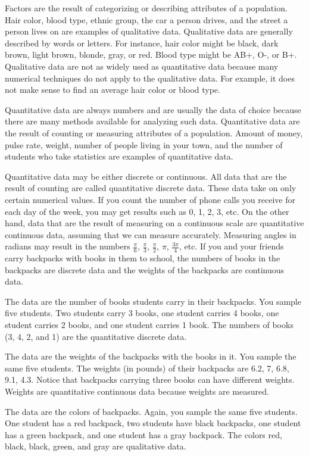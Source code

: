 \documentclass[
]{krantz}
\theoremstyle{definition}
\theoremstyle{definition}
\theoremstyle{definition}
\theoremstyle{remark}
\begin{document}
Factors are the result of categorizing or describing attributes of a population. Hair color, blood type, ethnic group, the car a person drives, and the street a person lives on are examples of qualitative data. Qualitative data are generally described by words or letters. For instance, hair color might be black, dark brown, light brown, blonde, gray, or red. Blood type might be AB+, O-, or B+. Qualitative data are not as widely used as quantitative data because many numerical techniques do not apply to the qualitative data. For example, it does not make sense to find an average hair color or blood type.

Quantitative data are always numbers and are usually the data of choice because there are many methods available for analyzing such data. Quantitative data are the result of counting or measuring attributes of a population. Amount of money, pulse rate, weight, number of people living in your town, and the number of students who take statistics are examples of quantitative data.

Quantitative data may be either discrete or continuous. All data that are the result of counting are called quantitative discrete data. These data take on only certain numerical values. If you count the number of phone calls you receive for each day of the week, you may get results such as 0, 1, 2, 3, etc. On the other hand, data that are the result of measuring on a continuous scale are quantitative continuous data, assuming that we can measure accurately. Measuring angles in radians may result in the numbers \(\frac{\pi}{6}\), \(\frac{\pi}{3}\), \(\frac{\pi}{2}\), \(\pi\), \(\frac{3\pi}{4}\), etc. If you and your friends carry backpacks with books in them to school, the numbers of books in the backpacks are discrete data and the weights of the backpacks are continuous data.

The data are the number of books students carry in their backpacks. You sample five students. Two students carry 3 books, one student carries 4 books, one student carries 2 books, and one student carries 1 book. The numbers of books (3, 4, 2, and 1) are the quantitative discrete data.

The data are the weights of the backpacks with the books in it. You sample the same five students. The weights (in pounds) of their backpacks are 6.2, 7, 6.8, 9.1, 4.3. Notice that backpacks carrying three books can have different weights. Weights are quantitative continuous data because weights are measured.

The data are the colors of backpacks. Again, you sample the same five students. One student has a red backpack, two students have black backpacks, one student has a green backpack, and one student has a gray backpack. The colors red, black, black, green, and gray are qualitative data.
\end{document}
